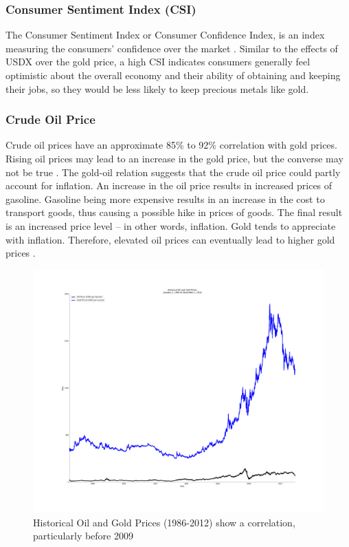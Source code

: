 \documentclass[runningheads]{llncs}
\begin{document}
\subsubsection{Consumer Sentiment Index (CSI)} 
The Consumer Sentiment Index or Consumer Confidence Index, is an index measuring the consumers' confidence over the market \cite{csi-1}\cite{csi-2}. Similar to the effects of USDX over the gold price, a high CSI indicates consumers generally feel optimistic about the overall economy and their ability of obtaining and keeping their jobs, so they would be less likely to keep precious metals like gold.

\subsubsection{Crude Oil Price}
Crude oil prices have an approximate 85\% to 92\% correlation with gold prices. Rising oil prices may lead to an increase in the gold price, but the converse may not be true \cite{gold-shafiee}\cite{gold-zhang}.
The gold-oil relation suggests that the crude oil price could partly account for inflation. An increase in the oil price results in increased prices of gasoline. Gasoline being more expensive results in an increase in the cost to transport goods, thus causing a possible hike in prices of goods. The final result is an increased price level – in other words, inflation. Gold tends to appreciate with inflation. Therefore, elevated oil prices can eventually lead to higher gold prices \cite{gold-url1}. 

\begin{figure}
\centering
\includegraphics[width=\textwidth]{OilvsGold.png}
\caption{Historical Oil and Gold Prices (1986-2012) show a correlation, particularly before 2009}
\label{fig:OilvsGold.png}\begin{flushright}\end{flushright}
\end{figure}
\end{document}
